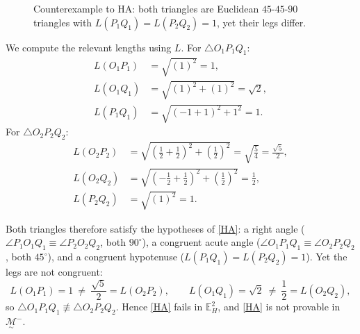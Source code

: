 \documentclass[11pt,a4paper]{article}
\theoremstyle{definition}
\theoremstyle{remark}
\numberwithin{equation}{section}
\newcommand{\MG}{\underset{\sim}{\mathcal{M}}} %
\begin{document}
\begin{figure}[ht!]
\centering
{}
\caption{Counterexample to HA: both triangles are Euclidean $45$-$45$-$90$ triangles with
$L(P_1Q_1)=L(P_2Q_2)=1$, yet their legs differ.}
\label{PEN_H_HAf}
\end{figure}

We compute the relevant lengths using $L$. For $\triangle O_1P_1Q_1$:
\begin{align*}
L(O_1P_1)&=\sqrt{(1)^2}=1,\\
L(O_1Q_1)&=\sqrt{(1)^2+(1)^2}=\sqrt2,\\
L(P_1Q_1)&=\sqrt{(-1+1)^2+1^2}=1.
\end{align*}
For $\triangle O_2P_2Q_2$:
\begin{align*}
L(O_2P_2)&=\sqrt{\left(\tfrac12+\tfrac12\right)^2+\left(\tfrac12\right)^2}
=\sqrt{\tfrac54}=\frac{\sqrt5}{2},\\
L(O_2Q_2)&=\sqrt{\left(-\tfrac12+\tfrac12\right)^2+\left(\tfrac12\right)^2}=\frac12,\\
L(P_2Q_2)&=\sqrt{(1)^2}=1.
\end{align*}

Both triangles therefore satisfy the hypotheses of \ref{HA}: a right angle
($\angle P_1O_1Q_1\equiv\angle P_2O_2Q_2$, both $90^\circ$), a congruent acute angle
($\angle O_1P_1Q_1\equiv\angle O_2P_2Q_2$, both $45^\circ$), and a congruent hypotenuse
($L(P_1Q_1)=L(P_2Q_2)=1$). Yet the legs are not congruent:
\begin{equation*}
L(O_1P_1)=1 \ \ne\ \frac{\sqrt5}{2}=L(O_2P_2), \qquad
L(O_1Q_1)=\sqrt2 \ \ne\ \frac12=L(O_2Q_2),
\end{equation*}
so $\triangle O_1P_1Q_1\not\equiv\triangle O_2P_2Q_2$. Hence \ref{HA} fails in
$\mathbb{E}_{H}^{2}$, and \ref{HA} is not provable in $\MG^{-}$.
\end{document}
